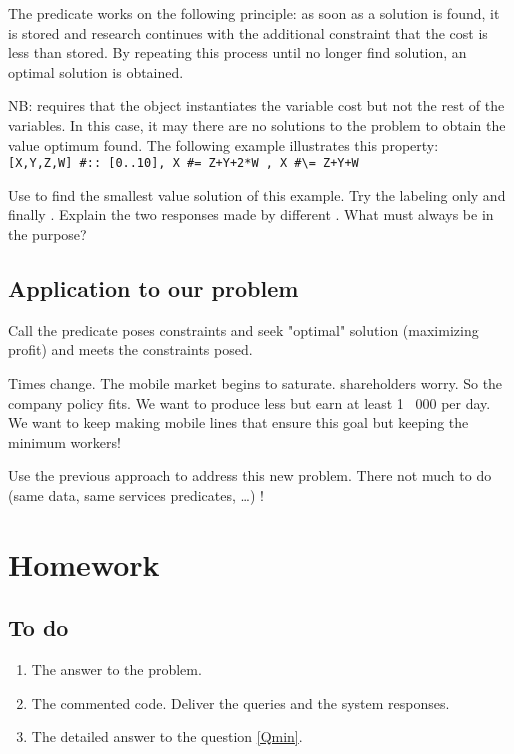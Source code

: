 The predicate  works on the following principle:
as soon as a solution is found, it is stored and research
continues with the additional constraint that the cost is less
than stored. By repeating this process until no longer find
solution, an optimal solution is obtained.

NB:  requires that the object instantiates the variable
cost but not the rest of the variables. In this case, it may
there are no solutions to the problem to obtain the value
optimum found. The following example illustrates this property:
\\\verb|[X,Y,Z,W] #:: [0..10], X #= Z+Y+2*W , X #\= Z+Y+W|

\begin{question}\label{Qmin}
  Use  to find the smallest value
    solution of this example. Try the labeling only
    and finally \code{[X, Y, Z, W]}. Explain the two responses
   made by different \eclipse{}. What must always be in
   the purpose?
\end{question}

\subsection{Application to our problem}

\begin{question}
Call the predicate poses constraints and seek
   "optimal" solution (maximizing profit) and meets the
   constraints posed.
\end{question}

Times change. The mobile market begins to saturate. shareholders
worry. So the company policy fits. We want to produce
less but earn at least 1 \, 000 per day. We want to keep making
mobile lines that ensure this goal but keeping the minimum
workers!

\begin{question} \label{TPCPC_Qfin}
Use the previous approach to address this new problem. There
not much to do (same data, same services predicates, \dots) !
\end{question}

\section{Homework}

\subsection{To do}

\begin{enumerate}
\item The answer to the problem.
\item The commented code. Deliver the queries \eclipse{} and
  the system responses.
\item The detailed answer to the question \ref{Qmin}.
\end{enumerate}


